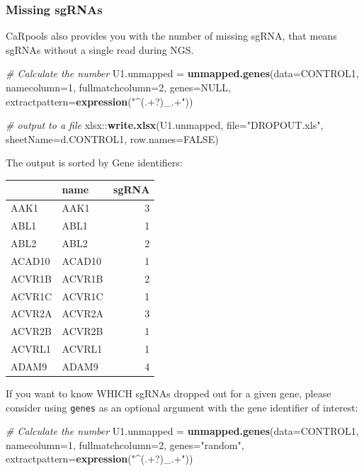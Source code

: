 \documentclass[]{article}
\newenvironment{Shaded}{\begin{snugshade}}{\end{snugshade}}
\newcommand{\KeywordTok}[1]{\textcolor[rgb]{0.13,0.29,0.53}{\textbf{{#1}}}}
\newcommand{\DataTypeTok}[1]{\textcolor[rgb]{0.13,0.29,0.53}{{#1}}}
\newcommand{\DecValTok}[1]{\textcolor[rgb]{0.00,0.00,0.81}{{#1}}}
\newcommand{\StringTok}[1]{\textcolor[rgb]{0.31,0.60,0.02}{{#1}}}
\newcommand{\CommentTok}[1]{\textcolor[rgb]{0.56,0.35,0.01}{\textit{{#1}}}}
\newcommand{\OtherTok}[1]{\textcolor[rgb]{0.56,0.35,0.01}{{#1}}}
\newcommand{\NormalTok}[1]{{#1}}
\begin{document}
\subsubsection{Missing sgRNAs}\label{missing-sgrnas}

CaRpools also provides you with the number of missing sgRNA, that means
sgRNAs without a single read during NGS.

\begin{Shaded}
\begin{Highlighting}[]
\CommentTok{# Calculate the number}
\NormalTok{U1.unmapped =}\StringTok{ }\KeywordTok{unmapped.genes}\NormalTok{(}\DataTypeTok{data=}\NormalTok{CONTROL1, }\DataTypeTok{namecolumn=}\DecValTok{1}\NormalTok{, }\DataTypeTok{fullmatchcolumn=}\DecValTok{2}\NormalTok{, }\DataTypeTok{genes=}\OtherTok{NULL}\NormalTok{, }\DataTypeTok{extractpattern=}\KeywordTok{expression}\NormalTok{(}\StringTok{"^(.+?)_.+"}\NormalTok{))}

\CommentTok{# output to a file}
\NormalTok{xlsx::}\KeywordTok{write.xlsx}\NormalTok{(U1.unmapped, }\DataTypeTok{file=}\StringTok{"DROPOUT.xls"}\NormalTok{, }\DataTypeTok{sheetName=}\NormalTok{d.CONTROL1, }\DataTypeTok{row.names=}\OtherTok{FALSE}\NormalTok{)}
\end{Highlighting}
\end{Shaded}

The output is sorted by Gene identifiers:

\begin{longtable}[c]{@{}llr@{}}
\toprule
& name & sgRNA\tabularnewline
\midrule
\endhead
AAK1 & AAK1 & 3\tabularnewline
ABL1 & ABL1 & 1\tabularnewline
ABL2 & ABL2 & 2\tabularnewline
ACAD10 & ACAD10 & 1\tabularnewline
ACVR1B & ACVR1B & 2\tabularnewline
ACVR1C & ACVR1C & 1\tabularnewline
ACVR2A & ACVR2A & 3\tabularnewline
ACVR2B & ACVR2B & 1\tabularnewline
ACVRL1 & ACVRL1 & 1\tabularnewline
ADAM9 & ADAM9 & 4\tabularnewline
\bottomrule
\end{longtable}

If you want to know WHICH sgRNAs dropped out for a given gene, please
consider using \texttt{genes} as an optional argument with the gene
identifier of interest:

\begin{Shaded}
\begin{Highlighting}[]
\CommentTok{# Calculate the number}
\NormalTok{U1.unmapped =}\StringTok{ }\KeywordTok{unmapped.genes}\NormalTok{(}\DataTypeTok{data=}\NormalTok{CONTROL1, }\DataTypeTok{namecolumn=}\DecValTok{1}\NormalTok{, }\DataTypeTok{fullmatchcolumn=}\DecValTok{2}\NormalTok{, }\DataTypeTok{genes=}\StringTok{"random"}\NormalTok{, }\DataTypeTok{extractpattern=}\KeywordTok{expression}\NormalTok{(}\StringTok{"^(.+?)_.+"}\NormalTok{))}
\end{Highlighting}
\end{Shaded}
\end{document}
